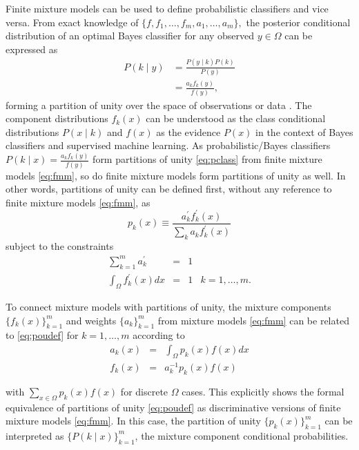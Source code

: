 \documentclass[10pt,letterpaper]{article}
\begin{document}
Finite mixture models can be used to define probabilistic classifiers and vice versa.
From exact knowledge of $\{f, f_1, \dots, f_{m}, a_1, \dots, a_{m}\},$ the posterior conditional distribution of an optimal Bayes classifier for any observed $y \in \Omega$ can be expressed as
\begin{align}
P(k\mid y) &= \frac{P(y\mid k) P(k)}{P(y)} \label{eq:pclass}\\
&= \frac{a_k f_k(y)}{f(y)},
\end{align}
forming a partition of unity over the space of observations or data \cite{fasshauer2007meshfree}.
The component distributions $f_k(x)$ can be understood as the class conditional distributions $P(x\mid k)$ and $f(x)$ as the evidence $P(x)$ in the context of  Bayes classifiers and supervised machine learning.
As probabilistic/Bayes classifiers $P(k\mid x)=\frac{a_k f_k(y)}{f(y)}$ form partitions of unity \eqref{eq:pclass} from finite mixture models \eqref{eq:fmm}, so do finite mixture models form partitions of unity as well.
In other words, partitions of unity can be defined first, without any reference to finite mixture models \eqref{eq:fmm}, as
\begin{equation}
p_k(x) \equiv \frac{a^\prime_k f^\prime_k(x)}{\sum_k a_k f_k^\prime(x)} \label{eq:poudef}
\end{equation}
subject to the constraints
\begin{equation}
\begin{array}{cccc}
\displaystyle \sum_{k = 1}^m a^\prime_k &=& 1 &\\
\displaystyle \int_\Omega f^\prime_k(x) dx &=& 1 & k = 1, \dots, m.
\end{array}\label{eq:poudefcon}
\end{equation}

To connect mixture models with partitions of unity, the mixture components $\{f_k(x)\}_{k = 1}^m$ and weights $\{a_k\}_{k = 1}^m$ from mixture models \eqref{eq:fmm} can be related to \eqref{eq:poudef} for $k=1, \dots, m$ according to
\begin{equation}
    \begin{array}{ccc}
        a_k(x) &=& \displaystyle\int_\Omega p_k(x) f(x) dx\\
        f_k(x) &=& a_k^{-1} p_k(x) f(x)\\
\\
    \end{array}
    \label{eq:waf}
\end{equation}
with $\displaystyle \sum_{x \in \Omega} p_k(x) f(x)$ for discrete $\Omega$ cases.
This explicitly shows the formal equivalence of partitions of unity \eqref{eq:poudef} as discriminative versions of finite mixture models \eqref{eq:fmm}.
In this case, the partition of unity $\{p_k(x)\}_{k = 1}^m$ can be interpreted as $\{P(k\mid x)\}_{k = 1}^m$, the mixture component conditional probabilities.
\end{document}
